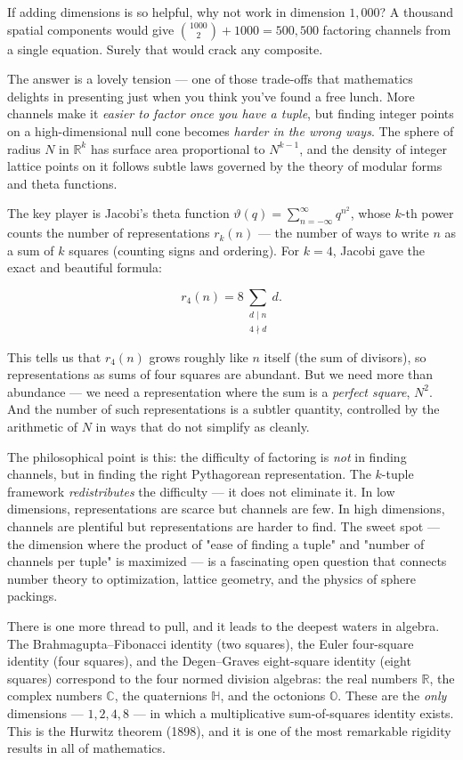 \documentclass[11pt,openany]{book}
\theoremstyle{definition}
\theoremstyle{plain}
\theoremstyle{remark}
\begin{document}
If adding dimensions is so helpful, why not work in dimension $1{,}000$? A thousand spatial components would give $\binom{1000}{2} + 1000 = 500{,}500$ factoring channels from a single equation. Surely that would crack any composite.

The answer is a lovely tension — one of those trade-offs that mathematics delights in presenting just when you think you've found a free lunch. More channels make it \textit{easier to factor once you have a tuple}, but finding integer points on a high-dimensional null cone becomes \textit{harder in the wrong ways}. The sphere of radius $N$ in $\mathbb{R}^k$ has surface area proportional to $N^{k-1}$, and the density of integer lattice points on it follows subtle laws governed by the theory of modular forms and theta functions.

The key player is Jacobi's theta function $\vartheta(q) = \sum_{n=-\infty}^{\infty} q^{n^2}$, whose $k$-th power counts the number of representations $r_k(n)$ — the number of ways to write $n$ as a sum of $k$ squares (counting signs and ordering). For $k = 4$, Jacobi gave the exact and beautiful formula:

$$r_4(n) = 8 \sum_{\substack{d \mid n \\ 4 \nmid d}} d.$$

This tells us that $r_4(n)$ grows roughly like $n$ itself (the sum of divisors), so representations as sums of four squares are abundant. But we need more than abundance — we need a representation where the sum is a \textit{perfect square}, $N^2$. And the number of such representations is a subtler quantity, controlled by the arithmetic of $N$ in ways that do not simplify as cleanly.

The philosophical point is this: the difficulty of factoring is \textit{not} in finding channels, but in finding the right Pythagorean representation. The $k$-tuple framework \textit{redistributes} the difficulty — it does not eliminate it. In low dimensions, representations are scarce but channels are few. In high dimensions, channels are plentiful but representations are harder to find. The sweet spot — the dimension where the product of "ease of finding a tuple" and "number of channels per tuple" is maximized — is a fascinating open question that connects number theory to optimization, lattice geometry, and the physics of sphere packings.

There is one more thread to pull, and it leads to the deepest waters in algebra. The Brahmagupta–Fibonacci identity (two squares), the Euler four-square identity (four squares), and the Degen–Graves eight-square identity (eight squares) correspond to the four normed division algebras: the real numbers $\mathbb{R}$, the complex numbers $\mathbb{C}$, the quaternions $\mathbb{H}$, and the octonions $\mathbb{O}$. These are the \textit{only} dimensions — $1, 2, 4, 8$ — in which a multiplicative sum-of-squares identity exists. This is the Hurwitz theorem (1898), and it is one of the most remarkable rigidity results in all of mathematics.
\end{document}
